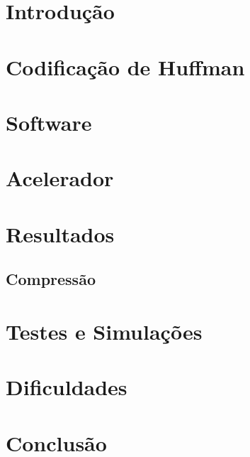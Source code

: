\documentclass[a4paper]{article}
\begin{document}
	

	\tableofcontents

  \pagebreak

  \setcounter{page}{1}

	\section{Introdução}
  

	\section{Codificação de Huffman}
	\label{sec:theory}
  

	\section{Software}
  

	\section{Acelerador}
	\label{sec:accelerator}
  

	\section{Resultados}
	\label{sec:results}
  

	\subsection{Compressão}

	\section{Testes e Simulações}

	\section{Dificuldades}

	\section{Conclusão}

  \pagebreak

  \listoffigures
  \listoftables

\end{document}
